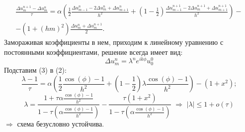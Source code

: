 \documentclass{article}
\theoremstyle{remark}
\theoremstyle{definition}
\begin{document}
\begin{itemize}
\begin{multline*}
\frac{\Delta u^{n+1}_m-\Delta u^n_m}{\tau}=\alpha\left(\frac{1}{2}\frac{\Delta u^n_{m-1}-2\Delta u^n_m+\Delta u^n_{m+1}}{h^2}+(1-\frac{1}{2})\frac{\Delta u^{n+1}_{m-1}-2\Delta u^{n+1}_m+\Delta u^{n+1}_{m+1}}{h^2}\right)-\\
-(1+(hm)^2)\frac{\Delta u^n_m+ \Delta u^{n+1}_m}2.
\end{multline*}
	Замораживая коэффициенты в нем, приходим к линейному уравнению с постоянными коэффициентами, решение всегда имеет вид:
	\begin{equation}
	\Delta u^n_m=\lambda^n e^{ik\phi}u^0_0
	\end{equation}
	Подставим (3) в (2):
$$
\frac{\lambda-1}\tau=\alpha\left(\frac{1}{2}\frac{\cos(\phi)-1}{h^2}+(1-\frac{1}{2})\lambda\frac{\cos(\phi)-1}{h^2}\right)-(1+x^2);
$$	
$$
\lambda=\frac{1+\tau\alpha\frac{\cos(\phi)-1}{h^2}}{1-\tau\left(\alpha\frac{\cos(\phi)-1}{h^2}\right)}-\frac{\tau(1+x^2)}{1-\tau\left(\alpha\frac{\cos(\phi)-1}{h^2}\right)}\,\,\Rightarrow\,\,|\lambda|\leq 1+o(\tau)
$$	
$\Rightarrow$ схема безусловно устойчива.
	

\end{itemize}
\end{document}
